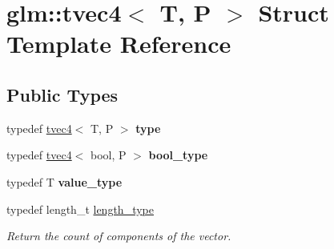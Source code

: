 \hypertarget{structglm_1_1tvec4}{\section{glm\-:\-:tvec4$<$ T, P $>$ Struct Template Reference}
\label{structglm_1_1tvec4}
}
\subsection*{Public Types}
\begin{DoxyCompactItemize}
\item 
\hypertarget{structglm_1_1tvec4_a8896f36a5499c8908772db7faf59e981}{typedef \hyperlink{structglm_1_1tvec4}{tvec4}$<$ T, P $>$ {\bfseries type}}\label{structglm_1_1tvec4_a8896f36a5499c8908772db7faf59e981}

\item 
\hypertarget{structglm_1_1tvec4_aace03487e0707681ffa197d4e844501b}{typedef \hyperlink{structglm_1_1tvec4}{tvec4}$<$ bool, P $>$ {\bfseries bool\-\_\-type}}\label{structglm_1_1tvec4_aace03487e0707681ffa197d4e844501b}

\item 
\hypertarget{structglm_1_1tvec4_ac6521112942e4500f26c0c0799b2cfa9}{typedef T {\bfseries value\-\_\-type}}\label{structglm_1_1tvec4_ac6521112942e4500f26c0c0799b2cfa9}

\item 
\hypertarget{structglm_1_1tvec4_a4e2b34a427cac7e72b6f73173c206feb}{typedef length\-\_\-t \hyperlink{structglm_1_1tvec4_a4e2b34a427cac7e72b6f73173c206feb}{length\-\_\-type}}\label{structglm_1_1tvec4_a4e2b34a427cac7e72b6f73173c206feb}

\begin{DoxyCompactList}\small\item\em Return the count of components of the vector. \end{DoxyCompactList}\end{DoxyCompactItemize}
